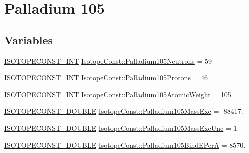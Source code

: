 \hypertarget{group___isotope_const-_palladium-_pd105}{}\section{Palladium 105}
\label{group___isotope_const-_palladium-_pd105}
\subsection*{Variables}
\begin{DoxyCompactItemize}
\item 
\mbox{\hyperlink{group___isotope_const-_macros_ga5f18360b3e99483a35c32d789e62621c}{I\+S\+O\+T\+O\+P\+E\+C\+O\+N\+S\+T\+\_\+\+I\+NT}} \mbox{\hyperlink{group___isotope_const-_palladium-_pd105_gab12b949d25a51f3161e6143d706e3c89}{Isotope\+Const\+::\+Palladium105\+Neutrons}} = 59
\item 
\mbox{\hyperlink{group___isotope_const-_macros_ga5f18360b3e99483a35c32d789e62621c}{I\+S\+O\+T\+O\+P\+E\+C\+O\+N\+S\+T\+\_\+\+I\+NT}} \mbox{\hyperlink{group___isotope_const-_palladium-_pd105_ga0903490454b96790d9ee6e66a810e403}{Isotope\+Const\+::\+Palladium105\+Protons}} = 46
\item 
\mbox{\hyperlink{group___isotope_const-_macros_ga5f18360b3e99483a35c32d789e62621c}{I\+S\+O\+T\+O\+P\+E\+C\+O\+N\+S\+T\+\_\+\+I\+NT}} \mbox{\hyperlink{group___isotope_const-_palladium-_pd105_ga1015b0fcfa7619eb95e595579ac415cd}{Isotope\+Const\+::\+Palladium105\+Atomic\+Weight}} = 105
\item 
\mbox{\hyperlink{group___isotope_const-_macros_ga8f45a7272ce02c0b4c65c44636ed719a}{I\+S\+O\+T\+O\+P\+E\+C\+O\+N\+S\+T\+\_\+\+D\+O\+U\+B\+LE}} \mbox{\hyperlink{group___isotope_const-_palladium-_pd105_ga61253d229222f035c61278571acbbe32}{Isotope\+Const\+::\+Palladium105\+Mass\+Exc}} = -\/88417.
\item 
\mbox{\hyperlink{group___isotope_const-_macros_ga8f45a7272ce02c0b4c65c44636ed719a}{I\+S\+O\+T\+O\+P\+E\+C\+O\+N\+S\+T\+\_\+\+D\+O\+U\+B\+LE}} \mbox{\hyperlink{group___isotope_const-_palladium-_pd105_ga38e16a5066170cb11d8c0674212d47d7}{Isotope\+Const\+::\+Palladium105\+Mass\+Exc\+Unc}} = 1.
\item 
\mbox{\hyperlink{group___isotope_const-_macros_ga8f45a7272ce02c0b4c65c44636ed719a}{I\+S\+O\+T\+O\+P\+E\+C\+O\+N\+S\+T\+\_\+\+D\+O\+U\+B\+LE}} \mbox{\hyperlink{group___isotope_const-_palladium-_pd105_ga2f981c76d52bf2076003f5739e10f52b}{Isotope\+Const\+::\+Palladium105\+Bind\+E\+PerA}} = 8570.
\item 

\end{DoxyCompactItemize}
